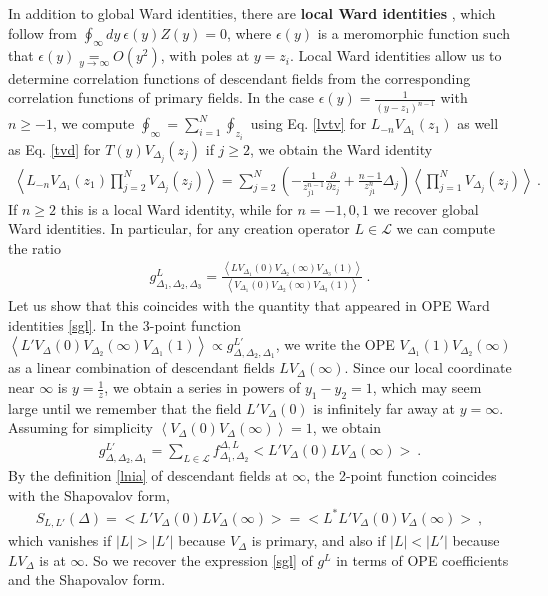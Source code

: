 \documentclass[12pt, a4paper]{article}
\newcommand{\myindex}[1]{\textbf{\boldmath #1}}
\begin{document}
In addition to global Ward identities, there are \myindex{local Ward identities} , which follow from $\oint_\infty dy\ \epsilon(y)Z(y)=0$, where $\epsilon(y)$ is a meromorphic function such that $\epsilon(y)\underset{y\to\infty}{=}O(y^2)$, with poles at $y=z_i$. Local Ward identities allow us to determine correlation functions of descendant fields from the corresponding correlation functions of primary fields. In the case $\epsilon(y) = \frac{1}{(y-z_1)^{n-1}}$ with $n\geq -1$, we compute $\oint_\infty = \sum_{i=1}^N\oint_{z_i}$ using Eq. \eqref{lvtv} for $L_{-n}V_{\Delta_1}(z_1)$ as well as Eq. \eqref{tvd} for $T(y)V_{\Delta_j}(z_j)$ if $j\geq 2$, we obtain the Ward identity
\begin{align}
 \left<L_{-n}V_{\Delta_1}(z_1)\prod_{j=2}^N V_{\Delta_j}(z_j)\right> = \sum_{j=2}^N \left(-\frac{1}{z_{j1}^{n-1}}\frac{\partial}{\partial z_j} +\frac{n-1}{z_{j1}^n} \Delta_j\right) \left<\prod_{j=1}^N V_{\Delta_j}(z_j)\right>\ . 
 \label{lwi}
\end{align}
If $n\geq 2$ this is a local Ward identity, while for $n=-1,0,1$ we recover global Ward identities. 
In particular, for any creation operator $L\in\mathcal{L}$ we can compute the ratio
\begin{align}
 g^L_{\Delta_1,\Delta_2,\Delta_3} = \frac{\left< LV_{\Delta_1}(0) V_{\Delta_2}(\infty)V_{\Delta_3}(1)\right>}{\left< V_{\Delta_1}(0) V_{\Delta_2}(\infty)V_{\Delta_3}(1)\right>}\ .
 \label{gl}
\end{align}
Let us show that this coincides with the quantity that appeared in OPE Ward identities \eqref{sgl}. 
In the 3-point function $\left< L'V_\Delta(0)V_{\Delta_2}(\infty)V_{\Delta_1}(1)\right>\propto g^{L'}_{\Delta,\Delta_2,\Delta_1}$, we write the OPE $V_{\Delta_1}(1)V_{\Delta_2}(\infty)$ as a linear combination of descendant fields $LV_{\Delta}(\infty)$. Since our local coordinate near $\infty$ is $y=\frac{1}{z}$, we obtain a series in powers of $y_1-y_2=1$, which may seem large until we remember that the field $L'V_{\Delta}(0)$ is infinitely far away at $y=\infty$. 
Assuming for simplicity $\left<V_\Delta(0) V_\Delta(\infty) \right>=1$, 
we obtain
\begin{align}
 g^{L'}_{\Delta,\Delta_2,\Delta_1}= \sum_{L\in\mathcal{L}} f^{\Delta,L}_{\Delta_1,\Delta_2} \Big<L'V_\Delta(0) LV_\Delta(\infty) \Big> \ .
 \label{gfr}
\end{align}
By the definition \eqref{lnia} of descendant fields at $\infty$, the 2-point function coincides with the Shapovalov form, 
\begin{align}
 \boxed{S_{L,L'}(\Delta)  = \Big<L'V_\Delta(0) LV_\Delta(\infty) \Big> =  \Big<L^*L'V_\Delta(0) V_\Delta(\infty) \Big>} \ , 
 \label{sll}
 \end{align}
which vanishes if $|L|>|L'|$ because $V_\Delta$ is primary, and also if $|L|<|L'|$ because $LV_\Delta$ is at $\infty$. So we recover the expression \eqref{sgl} of $g^L$ in terms of OPE coefficients and the Shapovalov form. 
\end{document}
